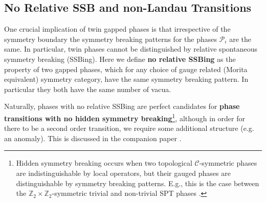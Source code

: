 \documentclass[aps,twocolumn,prx,floatfix,preprintnumbers, nofootinbib,10pt]{revtex4-2}
\numberwithin{equation}{section}
\theoremstyle{definition}
\newcommand{\Z}{{\mathbb Z}}
\newcommand{\cC}{\mathcal{C}}
\newcommand{\cP}{\mathcal{P}}
\begin{document}
\subsection{No Relative SSB and non-Landau Transitions}
\label{sec:no-rel-SSB}

One crucial implication of twin gapped phases is that irrespective of the symmetry boundary the symmetry breaking patterns for the phases $\cP_i$ are the same. In particular, twin phases cannot be distinguished by relative spontaneous symmetry breaking (SSBing). 
Here we define {\bf no relative SSBing} as the property of two gapped phases, which for any choice of gauge related (Morita equivalent) symmetry category, have the same symmetry breaking pattern. In particular they both have the same number of vacua.   

Naturally, phases with no relative SSBing are perfect candidates for {\bf phase transitions with no hidden symmetry breaking}\footnote{Hidden symmetry breaking occurs when two topological $\cC$-symmetric phases are indistinguishable by local operators, but their gauged phases are distinguishable by symmetry breaking patterns. E.g., this is the case between the $\Z_2\times \Z_2$-symmetric trivial and non-trivial SPT phases \cite{Kennedy:1992ifl}.}, although in order for there to be a second order transition, we require some additional structure (e.g. an anomaly). This is discussed in the companion paper \cite{WGS}. 
\end{document}
